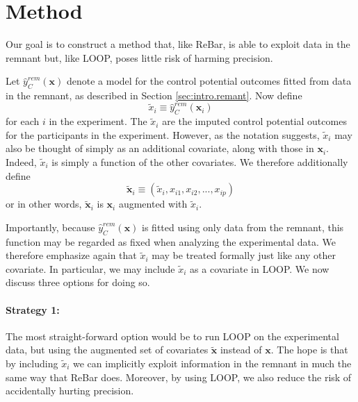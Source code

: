 \section{Method}
Our goal is to construct a method that, like ReBar, is able to exploit data in the remnant but, like LOOP, poses little risk of harming precision.

Let $\hat{y}_C^{rem}(\mathbf{x})$ denote a model for the control potential outcomes fitted from data in the remnant, as described in Section \ref{sec:intro.remant}.  Now define
\begin{equation}
\tilde{x}_{i} \equiv \hat{y}_C^{rem}(\mathbf{x}_i) 
\end{equation}
for each $i$ in the experiment.  The $\tilde{x}_{i}$ are the imputed control potential outcomes for the participants in the experiment.  However, as the notation suggests, $\tilde{x}_{i}$ may also be thought of simply as an additional covariate, along with those in $\mathbf{x}_i$.  Indeed, $\tilde{x}_i$ is simply a function of the other covariates.  We therefore additionally define
\begin{equation}
\tilde{\mathbf{x}}_i \equiv (\tilde{x}_{i}, x_{i1}, x_{i2}, ..., x_{ip}) 
\end{equation}
or in other words, $\tilde{\mathbf{x}}_i$ is $\mathbf{x}_i$ augmented with $\tilde{x}_i$.

Importantly, because $\hat{y}_C^{rem}(\mathbf{x})$ is fitted using only data from the remnant, this function may be regarded as fixed when analyzing the experimental data.  We therefore emphasize again that $\tilde{x}_{i}$ may be treated formally just like any other covariate.  In particular, we may include $\tilde{x}_{i}$ as a covariate in LOOP.  We now discuss three options for doing so.

\paragraph{Strategy 1:}  
The most straight-forward option would be to run LOOP on the experimental data, but using the augmented set of covariates $\tilde{\mathbf{x}}$ instead of $\mathbf{x}$.  The hope is that by including $\tilde{x}_{i}$ we can implicitly exploit information in the remnant in much the same way that ReBar does.  Moreover, by using LOOP, we also reduce the risk of accidentally hurting precision.

